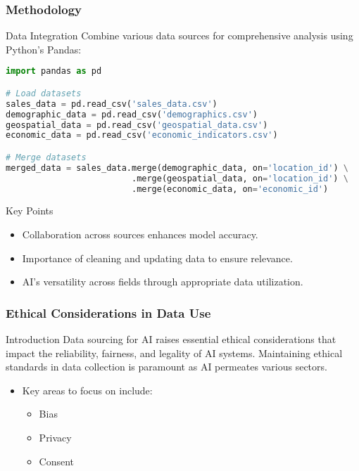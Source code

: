\documentclass[aspectratio=169]{beamer}
\begin{document}
\begin{frame}[fragile]
    \frametitle{Methodology}
    \begin{block}{Data Integration}
        Combine various data sources for comprehensive analysis using Python's Pandas:
        \begin{lstlisting}[language=python]
import pandas as pd

# Load datasets
sales_data = pd.read_csv('sales_data.csv')
demographic_data = pd.read_csv('demographics.csv')
geospatial_data = pd.read_csv('geospatial_data.csv')
economic_data = pd.read_csv('economic_indicators.csv')

# Merge datasets
merged_data = sales_data.merge(demographic_data, on='location_id') \
                         .merge(geospatial_data, on='location_id') \
                         .merge(economic_data, on='economic_id')
        \end{lstlisting}
    \end{block}

    \begin{block}{Key Points}
        \begin{itemize}
            \item Collaboration across sources enhances model accuracy.
            \item Importance of cleaning and updating data to ensure relevance.
            \item AI's versatility across fields through appropriate data utilization.
        \end{itemize}
    \end{block}
\end{frame}

\begin{frame}[fragile]
    \frametitle{Ethical Considerations in Data Use}
    \begin{block}{Introduction}
        Data sourcing for AI raises essential ethical considerations that impact the reliability, fairness, and legality of AI systems. Maintaining ethical standards in data collection is paramount as AI permeates various sectors.
    \end{block}
    \begin{itemize}
        \item Key areas to focus on include:
        \begin{itemize}
            \item Bias
            \item Privacy
            \item Consent
        \end{itemize}
    \end{itemize}
\end{frame}
\end{document}
